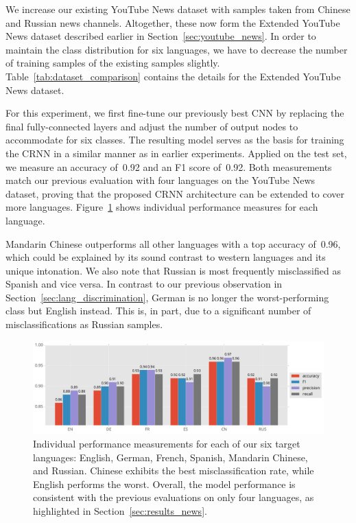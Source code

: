 We increase our existing YouTube News dataset with samples taken from Chinese and Russian news channels. Altogether, these now form the Extended YouTube News dataset described earlier in Section~\ref{sec:youtube_news}. In order to maintain the class distribution for six languages, we have to decrease the number of training samples of the existing samples slightly. Table~\ref{tab:dataset_comparison} contains the details for the Extended YouTube News dataset.

For this experiment, we first fine-tune our previously best CNN by replacing the final fully-connected layers and adjust the number of output nodes to accommodate for six classes. The resulting model serves as the basis for training the CRNN in a similar manner as in earlier experiments. Applied on the test set, we measure an accuracy of~\num{0.92} and an F1 score of~\num{0.92}. Both measurements match our previous evaluation with four languages on the YouTube News dataset, proving that the proposed CRNN architecture can be extended to cover more languages. Figure~\ref{fig:6lang} shows individual performance measures for each language.

Mandarin Chinese outperforms all other languages with a top accuracy of~\num{0.96}, which could be explained by its sound contrast to western languages and its unique intonation. We also note that Russian is most frequently misclassified as Spanish and vice versa. In contrast to our previous observation in Section~\ref{sec:lang_discrimination}, German is no longer the worst-performing class but English instead. This is, in part, due to a significant number of misclassifications as Russian samples.
%
	\begin{figure}[tp]
  		\centering
    	\includegraphics[width=\textwidth, keepaspectratio]{plots/results_6lang_plot.pdf}
    	\caption{Individual performance measurements for each of our six target languages: English, German, French, Spanish, Mandarin Chinese, and Russian. Chinese exhibits the best misclassification rate, while English performs the worst. Overall, the model performance is consistent with the previous evaluations on only four languages, as highlighted in Section~\ref{sec:results_news}.}
    	\label{fig:6lang}
	\end{figure}
%

